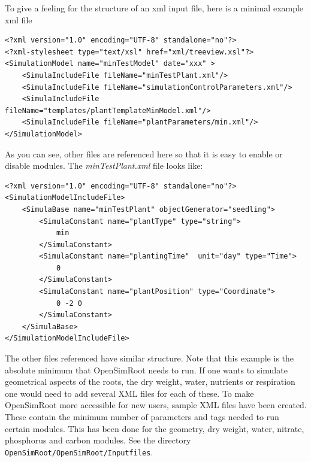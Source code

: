 \documentclass{article}
\begin{document}

\noindent To give a feeling for the structure of an xml input file, here is a minimal example xml file

\lstset{language=xml}
\begin{lstlisting}
<?xml version="1.0" encoding="UTF-8" standalone="no"?>
<?xml-stylesheet type="text/xsl" href="xml/treeview.xsl"?>
<SimulationModel name="minTestModel" date="xxx" >
    <SimulaIncludeFile fileName="minTestPlant.xml"/>	
    <SimulaIncludeFile fileName="simulationControlParameters.xml"/>
    <SimulaIncludeFile fileName="templates/plantTemplateMinModel.xml"/>
    <SimulaIncludeFile fileName="plantParameters/min.xml"/>
</SimulationModel>
\end{lstlisting}

\noindent As you can see, other files are referenced here so that it is easy to enable or disable modules. The \textit{minTestPlant.xml} file looks like:

\begin{lstlisting}
<?xml version="1.0" encoding="UTF-8" standalone="no"?>
<SimulationModelIncludeFile>
    <SimulaBase name="minTestPlant" objectGenerator="seedling">
        <SimulaConstant name="plantType" type="string"> 
            min
        </SimulaConstant>	
        <SimulaConstant name="plantingTime"  unit="day" type="Time">
            0
        </SimulaConstant>	
        <SimulaConstant name="plantPosition" type="Coordinate">
            0 -2 0
        </SimulaConstant>
    </SimulaBase>
</SimulationModelIncludeFile>
\end{lstlisting}

\noindent The other files referenced have similar structure. Note that this example is the absolute minimum that OpenSimRoot needs to run. If one wants to simulate geometrical aspects of the roots, the dry weight, water, nutrients or respiration one would need to add several XML files for each of these. To make OpenSimRoot more accessible for new users, sample XML files have been created. These contain the minimum number of parameters and tags needed to run certain modules. This has been done for the geometry, dry weight, water, nitrate, phosphorus and carbon modules. See the directory \verb|OpenSimRoot/OpenSimRoot/Inputfiles|. \newline %
\end{document}
